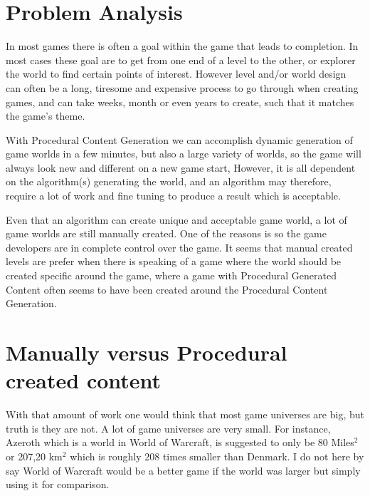 \section{Problem Analysis}

In most games there is often a goal within the game that leads to completion. In most cases these goal are to get from one end of a level to the other, or explorer the world to find certain points of interest. However level and/or world design can often be a long, tiresome and expensive process to go through when creating games, and can take weeks, month or even years to create, such that it matches the game's theme.

With Procedural Content Generation we can accomplish dynamic generation of game worlds in a few minutes, but also a large variety of worlds, so the game will always look new and different on a new game start, However, it is all dependent on the algorithm(s) generating the world, and an algorithm may therefore, require a lot of work and fine tuning to produce a result which is acceptable.

Even that an algorithm can create unique and acceptable game world, a lot of game worlds are still manually created. One of the reasons is so the game developers are in complete control over the game. It seems that manual created levels are prefer when there is speaking of a game where the world should be created specific around the game, where a game with Procedural Generated Content often seems to have been created around the Procedural Content Generation.


\section{Manually versus Procedural created content}

With that amount of work one would think that most game universes are big, but truth is they are not. A lot of game universes are very small. For instance, Azeroth which is a world in World of Warcraft, is suggested to only be 80 Miles$^2$ or 207,20 km$^2$ \cite{GameWorldSize} which is roughly 208 times smaller than Denmark. I do not here by say World of Warcraft would be a better game if the world was larger but simply using it for comparison.


